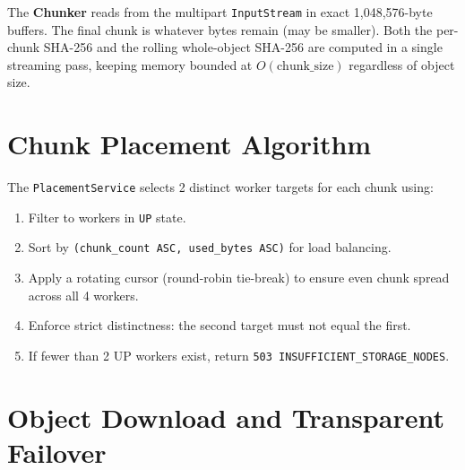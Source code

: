 \documentclass[12pt,a4paper]{report}
\begin{document}
\begin{keypoint}
The \textbf{Chunker} reads from the multipart \texttt{InputStream} in exact 1,048,576-byte buffers. The final chunk is whatever bytes remain (may be smaller). Both the per-chunk SHA-256 and the rolling whole-object SHA-256 are computed in a single streaming pass, keeping memory bounded at $O(\text{chunk\_size})$ regardless of object size.
\end{keypoint}

\section{Chunk Placement Algorithm}

The \texttt{PlacementService} selects 2 distinct worker targets for each chunk using:
\begin{enumerate}
  \item Filter to workers in \texttt{UP} state.
  \item Sort by \texttt{(chunk\_count ASC, used\_bytes ASC)} for load balancing.
  \item Apply a rotating cursor (round-robin tie-break) to ensure even chunk spread across all 4 workers.
  \item Enforce strict distinctness: the second target must not equal the first.
  \item If fewer than 2 UP workers exist, return \texttt{503 INSUFFICIENT\_STORAGE\_NODES}.
\end{enumerate}

\section{Object Download and Transparent Failover}
\end{document}
